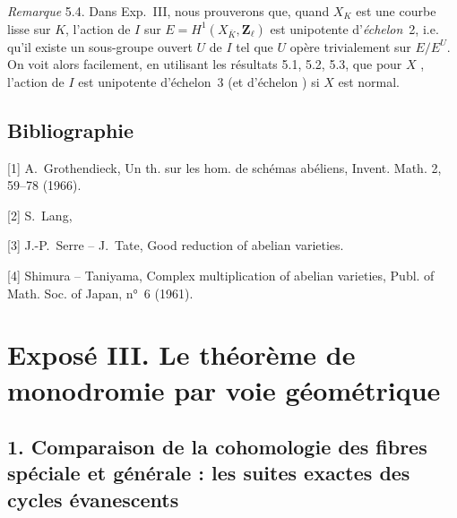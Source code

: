 \documentclass[11pt,a4paper]{article}
\begin{document}

\emph{Remarque} 5.4. Dans Exp.~III, nous prouverons que, quand $X_K$ est une courbe   lisse sur $K$, l'action de $I$ sur $E = H^1(X_{\bar K}, \mathbf{Z}_\ell)$ est \struck{\ill{}} unipotente \struck{\ill{}} d'\emph{échelon}~2, i.e. qu'il existe un sous-groupe ouvert $U$ de $I$ tel que $U$ opère  trivialement sur \struck{\ill{}} $E/E^U$. On voit alors facilement, en utilisant les résultats 5.1, 5.2, 5.3, \struck{\ill{}} que pour  $X$ , l'action de $I$ est \struck{\ill{}}  unipotente d'échelon~3 (et  d'échelon  ) si $X$ est normal.

\subsection*{Bibliographie}

[1] A.~Grothendieck, Un th. sur les hom. de schémas abéliens, Invent. Math. 2, 59--78 (1966).

[2] S.~Lang,

[3] J.-P.~Serre -- J.~Tate, Good reduction of abelian varieties.

[4] Shimura -- Taniyama, Complex multiplication of abelian varieties, Publ. of Math. Soc. of Japan, n°~6 (1961).


\section*{Exposé III. Le théorème de monodromie par voie géométrique}

\subsection*{1. Comparaison de la cohomologie des fibres    spéciale et générale : les suites exactes des cycles évanescents}

\end{document}
